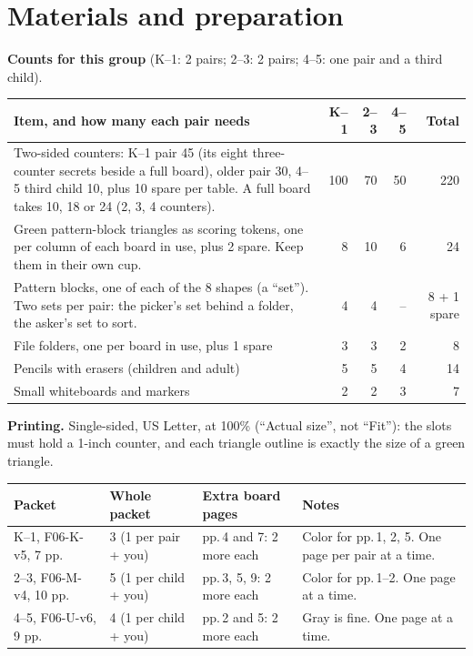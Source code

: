 \documentclass[11pt]{article}
\begin{document}
\section{Materials and preparation}

\textbf{Counts for this group} (K--1: 2 pairs; 2--3: 2 pairs; 4--5: one pair and a third child).

{\small\begin{tabularx}{\linewidth}{@{}L r r r r@{}}
\toprule
Item, and how many each pair needs & K--1 & 2--3 & 4--5 & Total\\
\midrule
Two-sided counters: K--1 pair 45 (its eight three-counter secrets beside a full board), older pair 30, 4--5 third child 10, plus 10 spare per table. A full board takes 10, 18 or 24 (2, 3, 4 counters). & 100 & 70 & 50 & 220\\
Green pattern-block triangles as scoring tokens, one per column of each board in use, plus 2 spare. Keep them in their own cup. & 8 & 10 & 6 & 24\\
Pattern blocks, one of each of the 8 shapes (a ``set''). Two sets per pair: the picker's set behind a folder, the asker's set to sort. & 4 & 4 & -- & 8 + 1 spare\\
File folders, one per board in use, plus 1 spare & 3 & 3 & 2 & 8\\
Pencils with erasers (children and adult) & 5 & 5 & 4 & 14\\
Small whiteboards and markers & 2 & 2 & 3 & 7\\
\bottomrule
\end{tabularx}}

\medskip
\textbf{Printing.} Single-sided, US Letter, at 100\% (``Actual size'', not ``Fit''): the slots must hold a 1-inch counter, and each triangle outline is exactly the size of a green triangle.

{\small\begin{tabularx}{\linewidth}{@{}l l l L@{}}
\toprule
Packet & Whole packet & Extra board pages & Notes\\
\midrule
K--1, F06-K-v5, 7 pp. & 3 (1 per pair + you) & pp.\,4 and 7: 2 more each & Color for pp.\,1, 2, 5. One page per pair at a time.\\
2--3, F06-M-v4, 10 pp. & 5 (1 per child + you) & pp.\,3, 5, 9: 2 more each & Color for pp.\,1--2. One page at a time.\\
4--5, F06-U-v6, 9 pp. & 4 (1 per child + you) & pp.\,2 and 5: 2 more each & Gray is fine. One page at a time.\\
\bottomrule
\end{tabularx}}
\end{document}
